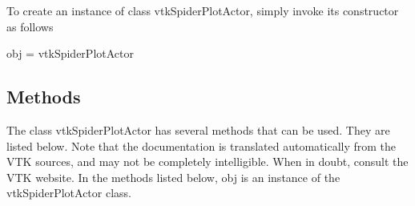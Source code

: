 To create an instance of class vtk\-Spider\-Plot\-Actor, simply invoke its constructor as follows \begin{DoxyVerb}  obj = vtkSpiderPlotActor
\end{DoxyVerb}
 \hypertarget{vtkwidgets_vtkxyplotwidget_Methods}{}\subsection{Methods}\label{vtkwidgets_vtkxyplotwidget_Methods}
The class vtk\-Spider\-Plot\-Actor has several methods that can be used. They are listed below. Note that the documentation is translated automatically from the V\-T\-K sources, and may not be completely intelligible. When in doubt, consult the V\-T\-K website. In the methods listed below, {\ttfamily obj} is an instance of the vtk\-Spider\-Plot\-Actor class. 
